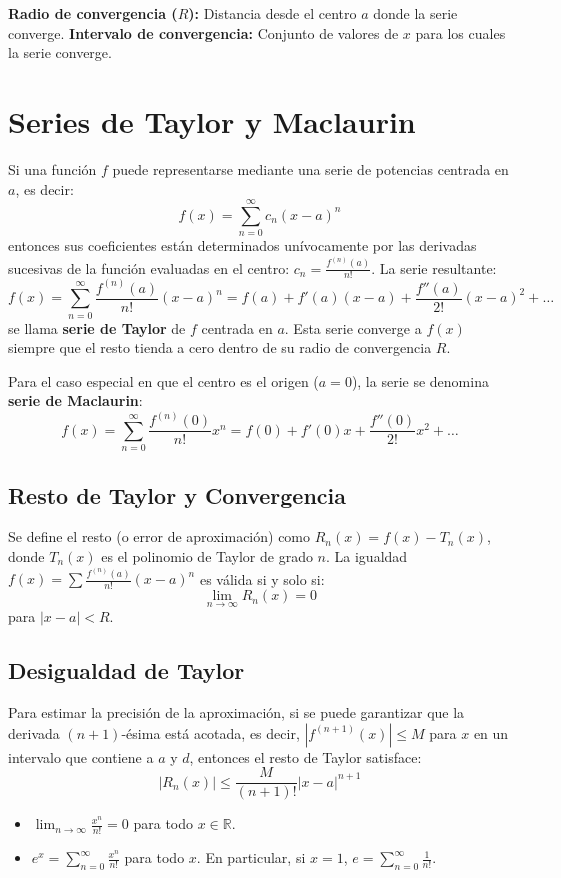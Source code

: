 \documentclass[a4paper,12pt]{article}
\begin{document}
\begin{tcolorbox}
    \textbf{Radio de convergencia ($R$):} Distancia desde el centro $a$ donde la serie converge.
    \textbf{Intervalo de convergencia:} Conjunto de valores de $x$ para los cuales la serie converge.
\end{tcolorbox}

\section{Series de Taylor y Maclaurin}
Si una función $f$ puede representarse mediante una serie de potencias centrada en $a$, es decir:
$$ f(x) = \sum_{n=0}^{\infty}c_n (x-a)^n $$
entonces sus coeficientes están determinados unívocamente por las derivadas sucesivas de la función evaluadas en el centro: $c_n = \frac{f^{(n)}(a)}{n!}$. La serie resultante:
$$ f(x) = \sum_{n=0}^{\infty} \frac{f^{(n)}(a)}{n!} (x-a)^n = f(a) + f'(a)(x-a) + \frac{f''(a)}{2!}(x-a)^2 + \dots $$
se llama \textbf{serie de Taylor} de $f$ centrada en $a$. Esta serie converge a $f(x)$ siempre que el resto tienda a cero dentro de su radio de convergencia $R$.

Para el caso especial en que el centro es el origen ($a = 0$), la serie se denomina \textbf{serie de Maclaurin}:
$$ f(x) = \sum_{n=0}^{\infty} \frac{f^{(n)}(0)}{n!} x^n = f(0) + f'(0)x + \frac{f''(0)}{2!}x^2 + \dots $$

\subsection{Resto de Taylor y Convergencia}
Se define el resto (o error de aproximación) como $R_n(x) = f(x) - T_n(x)$, donde $T_n(x)$ es el polinomio de Taylor de grado $n$. La igualdad $f(x) = \sum \frac{f^{(n)}(a)}{n!}(x-a)^n$ es válida si y solo si:
$$\lim_{n \to \infty} R_n(x) = 0 $$
para $|x-a| < R$.

\subsection{Desigualdad de Taylor}
Para estimar la precisión de la aproximación, si se puede garantizar que la derivada $(n+1)$-ésima está acotada, es decir, $|f^{(n+1)}(x)| \leqslant M$ para $x$ en un intervalo que contiene a $a$ y $d$, entonces el resto de Taylor satisface:
$$ |R_n(x)| \leqslant \frac{M}{(n+1)!} |x-a|^{n+1} $$

\begin{tcolorbox}[colback=blue!5,colframe=blue!75!black]
    \begin{itemize}
        \item $\lim_{n \to \infty} \frac{x^n}{n!} = 0$ para todo $x \in \mathbb{R}$.
        \item $e^x = \sum_{n=0}^{\infty} \frac{x^n}{n!}$ para todo $x$. En particular, si $x=1$, $e = \sum_{n=0}^{\infty} \frac{1}{n!}$.
    \end{itemize}
\end{tcolorbox}
\end{document}
